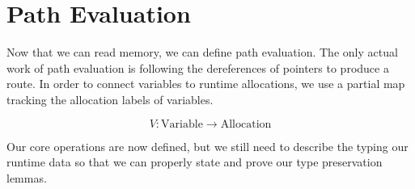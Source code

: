 \section*{Path Evaluation}

Now that we can read memory, we can define path evaluation.
The only actual work of path evaluation is following the dereferences of pointers
to produce a route. In order to connect variables to runtime allocations, we use
a partial map tracking the allocation labels of variables.

$$ V : \mathrm{Variable} \to \mathrm{Allocation} $$



Our core operations are now defined,
but we still need to describe the typing our runtime data
so that we can properly state and prove our type preservation lemmas.



